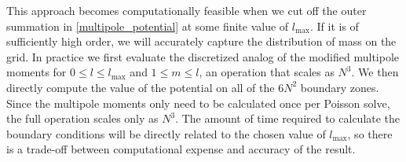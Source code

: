 \documentclass[iop]{../emulateapj}
\begin{document}
This approach becomes computationally feasible when we cut off the
outer summation in \autoref{multipole_potential} at some finite
value of $l_{\text{max}}$. If it is of sufficiently high order, we
will accurately capture the distribution of mass on the grid. In
practice we first evaluate the discretized analog of the modified
multipole moments for $0 \leq l \leq l_{\text{max}}$ and $1 \leq m
\leq l$, an operation that scales as $N^3$. We then directly compute
the value of the potential on all of the $6N^2$ boundary zones. Since
the multipole moments only need to be calculated once per Poisson
solve, the full operation scales only as $N^3$. The amount of time
required to calculate the boundary conditions will be directly related
to the chosen value of $l_{\text{max}}$, so there is a trade-off
between computational expense and accuracy of the result.
\end{document}
